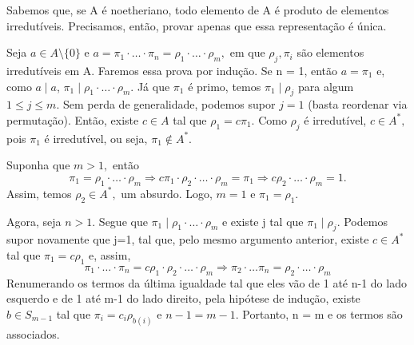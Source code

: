 \documentclass[algebraII_notes.tex]{subfiles}
\begin{document}
\begin{proof*}
	Sabemos que, se A é noetheriano, todo elemento de A é produto de elementos irredutíveis. Precisamos, então, provar apenas que essa representação é única.

	Seja \(a\in A\setminus{\{0\}}\) e \(a = \pi_{1}\cdot \dotsc \cdot \pi_{n} = \rho_{1}\cdot \dotsc \cdot \rho_{m},\) em que \(\rho_{j}, \pi_{i}\) são elementos
	irredutíveis em A. Faremos essa prova por indução. Se n = 1, então \(a = \pi_{1}\) e, como \(a\mid a\), \(\pi_{1}\mid\rho_{1}\cdot \dotsc \cdot \rho_{m}\). Já que
	\(\pi_{1}\) é primo, temos \(\pi_{1}\mid\rho_{j}\) para algum \(1\leq j\leq m.\) Sem perda de generalidade, podemos supor \(j=1\) (basta reordenar via permutação). Então, existe \(c\in A\) tal que \(\rho _{1} = c\pi_{1}.\) Como \(\rho_{j}\) é irredutível,
	\(c\in A^{*},\) pois \(\pi_{1}\) é irredutível, ou seja, \(\pi_{1}\not\in A^{*}\).

	Suponha que \(m > 1,\) então
	\[
		\pi_{1} = \rho_{1}\cdot \dotsc \cdot \rho_{m} \Rightarrow c\pi_{1}\cdot \rho_{2}\cdot \dotsc \cdot \rho_{m} = \pi_{1} \Rightarrow c\rho_{2} \cdot \dotsc \cdot \rho_{m} = 1.
	\]
	Assim, temos \(\rho_{2}\in A^{*},\) um absurdo. Logo, \(m=1\) e \(\pi_{1} = \rho_{1}\).

	Agora, seja \(n > 1\). Segue que \(\pi_{1}\mid \rho_{1}\cdot \dotsc \cdot \rho_{m}\) e existe j tal que \(\pi_{1}\mid\rho_{j}.\) Podemos supor novamente
	que j=1, tal que, pelo mesmo argumento anterior, existe \(c\in A^{*}\) tal que \(\pi_{1} = c\rho_{1}\) e, assim,
	\[
		\pi_{1}\cdot \dotsc \cdot \pi_{n} = c\rho_{1}\cdot \rho_{2} \cdot \dotsc \cdot \rho_{m} \Rightarrow \pi_{2}\cdot \dotsc \pi_{n} = \rho_{2}\cdot \dotsc \cdot \rho_{m}
	\]
	Renumerando os termos da última igualdade tal que eles vão de 1 até n-1 do lado esquerdo e de 1 até m-1 do lado direito, pela hipótese de indução, existe \(b\in S_{m-1}\)
	tal que \(\pi_{i} = c_{i}\rho_{b(i)}\) e \(n-1 = m-1.\) Portanto, n = m e os termos são associados. \qedsymbol
\end{proof*}
\end{document}
